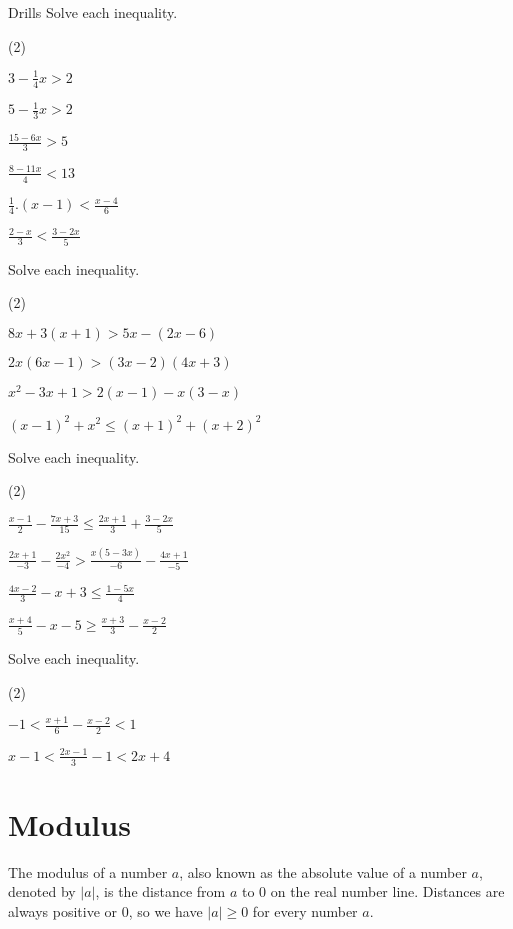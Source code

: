 \documentclass[../../main.tex]{subfiles}
\begin{document}
\begin{questions}{Drills}
Solve each inequality.
\begin{question_set}(2)
    \item $3-\frac{1}{4}x>2$
    \item $5-\frac{1}{3}x>2$
    \item $\frac{15-6x}{3}>5$
    \item $\frac{8-11x}{4}<13$
    \item $\frac{1}{4}.(x-1)<\frac{x-4}{6}$
    \item $\frac{2-x}{3}<\frac{3-2x}{5}$
\end{question_set}
Solve each inequality.
\begin{question_set}(2)
    \item $8x+3(x+1)>5x-(2x-6)$
    \item $2x(6x-1)>(3x-2)(4x+3)$
    \item $x^{2}-3x+1>2(x-1)-x(3-x)$
    \item $(x-1)^{2}+x^{2}\leq (x+1)^{2}+(x+2)^{2}$ %
\end{question_set}
Solve each inequality.
\begin{question_set}(2)
    \item $\frac{x-1}{2}-\frac{7x+3}{15}\leq \frac{2x+1}{3}+\frac{3-2x}{5}$
    \item $\frac{2x+1}{-3}-\frac{2x^{2}}{-4}>\frac{x(5-3x)}{-6}-\frac{4x+1}{-5}$
    \item $\frac{4x-2}{3}-x+3 \leq \frac{1-5x}{4}$
    \item $\frac{x+4}{5}-x-5\geq \frac{x+3}{3}-\frac{x-2}{2}$
\end{question_set}
Solve each inequality.
\begin{question_set} (2)
    \item $-1<\frac{x+1}{6}-\frac{x-2}{2}<1$
    \item $x-1<\frac{2x-1}{3}-1<2x+4$
\end{question_set}
\end{questions}

\section{Modulus}
The modulus of a number $a$, also known as the absolute value of a number $a$, denoted by $|a|$, is the distance from $a$ to 0 on the real number line. Distances are always positive or 0, so we have $|a|\geq 0$ for every number $a$. %
\end{document}
